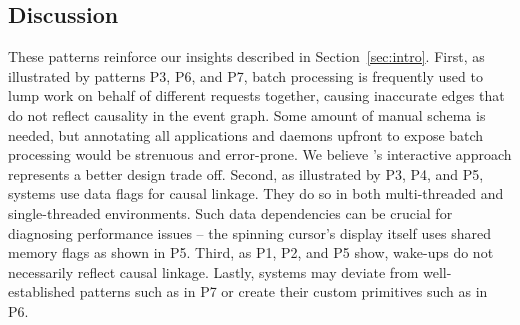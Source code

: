 \subsection{Discussion}

These patterns reinforce our insights described in Section~\ref{sec:intro}.
First, as illustrated by patterns P3, P6, and P7, batch processing is
frequently used to lump work on behalf of different requests together, causing
inaccurate edges that do not reflect causality in the event graph.  Some amount
of manual schema is needed, but annotating all applications and daemons upfront
to expose batch processing would be strenuous and error-prone.  We believe
\xxx's interactive approach represents a better design trade off.  Second, as
illustrated by P3, P4, and P5, systems use data flags for causal linkage.  They
do so in both multi-threaded and single-threaded environments.  Such data
dependencies can be crucial for diagnosing performance issues -- the spinning
cursor's display itself uses shared memory flags as shown in P5.  Third, as P1,
P2, and P5 show, wake-ups do not necessarily reflect causal linkage.  Lastly,
systems may deviate from well-established patterns such as in P7 or create
their custom primitives such as in P6.
